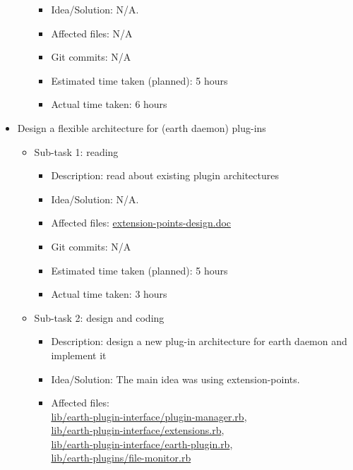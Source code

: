 \begin{itemize}
\begin{itemize}
\begin{itemize}
					\item Idea/Solution: N/A. 
					\item Affected files: N/A
					\item Git commits: N/A
					\item Estimated time taken (planned): 5 hours
					\item Actual time taken: 6 hours
				\end{itemize}
	     \end{itemize}
	\item Design a flexible architecture for (earth daemon) plug-ins
		\begin{itemize}
		\item Sub-task 1: reading
			\begin{itemize}
				\item Description: read about existing plugin architectures
				\item Idea/Solution: N/A.
				\item Affected files: \href{https://github.com/pamalite/segp2/tree/master/Subgroups/plugin_group/Documents/Design/extension_points_design.doc}{extension-points-design.doc}
				\item Git commits: N/A
				\item Estimated time taken (planned): 5 hours
				\item Actual time taken: 3 hours
			\end{itemize}
		\item Sub-task 2: design and coding
			\begin{itemize}
				\item Description: design a new plug-in architecture for earth daemon and implement it 
				\item Idea/Solution: The main idea was using extension-points.
				\item Affected files: \\
\href{http://github.com/mfbDev/earth/tree/metadata_as_plugin/lib/earth_plugin_interface/plugin_manager.rb}{lib/earth-plugin-interface/plugin-manager.rb},\\
\href{http://github.com/mfbDev/earth/tree/metadata_as_plugin/lib/earth_plugin_interface/extensions.rb}{lib/earth-plugin-interface/extensions.rb},\\
\href{http://github.com/mfbDev/earth/tree/metadata_as_plugin/lib/earth_plugin_interface/earth_plugin.rb}{lib/earth-plugin-interface/earth-plugin.rb},\\
\href{http://github.com/mfbDev/earth/tree/metadata_as_plugin/lib/earth_plugins/file_monitor.rb}{lib/earth-plugins/file-monitor.rb}


\end{itemize}
\end{itemize}
\end{itemize}
